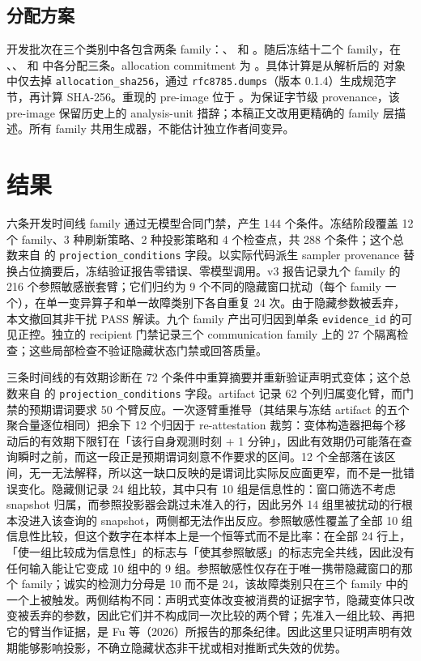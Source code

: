 \documentclass[UTF8,11pt]{ctexart}
\begin{document}
\subsection{分配方案}
开发批次在三个类别中各包含两条 family：、 和 。随后冻结十二个 family，在 、、 和  中各分配三条。allocation commitment 为 \texttt{}。具体计算是从解析后的  对象中仅去掉 \texttt{allocation\_sha256}，通过 \texttt{rfc8785.dumps}（版本 0.1.4）生成规范字节，再计算 SHA-256。重现的 pre-image 位于 。为保证字节级 provenance，该 pre-image 保留历史上的 analysis-unit 措辞；本稿正文改用更精确的 family 层描述。所有 family 共用生成器，不能估计独立作者间变异。

\section{结果}
六条开发时间线 family 通过无模型合同门禁，产生 144 个条件。冻结阶段覆盖 12 个 family、3 种刷新策略、2 种投影策略和 4 个检查点，共 288 个条件；这个总数来自  的 \texttt{projection\_conditions} 字段。以实际代码派生 sampler provenance 替换占位摘要后，冻结验证报告零错误、零模型调用。v3 报告记录九个 family 的 216 个参照敏感嵌套臂；它们归约为 9 个不同的隐藏窗口扰动（每个 family 一个），在单一变异算子和单一故障类别下各自重复 24 次。由于隐藏参数被丢弃，本文撤回其非干扰 PASS 解读。九个 family 产出可归因到单条 \texttt{evidence\_id} 的可见正控。独立的 recipient 门禁记录三个 communication family 上的 27 个隔离检查；这些局部检查不验证隐藏状态门禁或回答质量。

三条时间线的有效期诊断在 72 个条件中重算摘要并重新验证声明式变体；这个总数来自  的 \texttt{projection\_conditions} 字段。artifact 记录 62 个列归属变化臂，而门禁的预期谓词要求 50 个臂反应。一次逐臂重推导（其结果与冻结 artifact 的五个聚合量逐位相同）把余下 12 个归因于 re-attestation 裁剪：变体构造器把每个移动后的有效期下限钉在「该行自身观测时刻 + 1 分钟」，因此有效期仍可能落在查询瞬时之前，而这一段正是预期谓词刻意不作要求的区间。12 个全部落在该区间，无一无法解释，所以这一缺口反映的是谓词比实际反应面更窄，而不是一批错误变化。隐藏侧记录 24 组比较，其中只有 10 组是信息性的：窗口筛选不考虑 snapshot 归属，而参照投影器会跳过未准入的行，因此另外 14 组里被扰动的行根本没进入该查询的 snapshot，两侧都无法作出反应。参照敏感性覆盖了全部 10 组信息性比较，但这个数字在本样本上是一个恒等式而不是比率：在全部 24 行上，「使一组比较成为信息性」的标志与「使其参照敏感」的标志完全共线，因此没有任何输入能让它变成 10 组中的 9 组。参照敏感性仅存在于唯一携带隐藏窗口的那个 family；诚实的检测力分母是 10 而不是 24，该故障类别只在三个 family 中的一个上被触发。两侧结构不同：声明式变体改变被消费的证据字节，隐藏变体只改变被丢弃的参数，因此它们并不构成同一次比较的两个臂；先准入一组比较、再把它的臂当作证据，是 Fu 等（2026）所报告的那条纪律。因此这里只证明声明有效期能够影响投影，不确立隐藏状态非干扰或相对推断式失效的优势。
\end{document}
